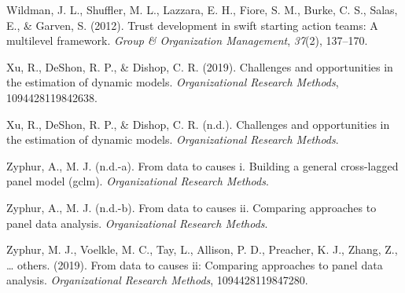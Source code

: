 \documentclass[english,,man]{apa6}
\begin{document}
\leavevmode\hypertarget{ref-wildman2012trust}{}%
Wildman, J. L., Shuffler, M. L., Lazzara, E. H., Fiore, S. M., Burke, C. S., Salas, E., \& Garven, S. (2012). Trust development in swift starting action teams: A multilevel framework. \emph{Group \& Organization Management}, \emph{37}(2), 137--170.

\leavevmode\hypertarget{ref-xu2019challenges}{}%
Xu, R., DeShon, R. P., \& Dishop, C. R. (2019). Challenges and opportunities in the estimation of dynamic models. \emph{Organizational Research Methods}, 1094428119842638.

\leavevmode\hypertarget{ref-xu_deshon_dishop}{}%
Xu, R., DeShon, R. P., \& Dishop, C. R. (n.d.). Challenges and opportunities in the estimation of dynamic models. \emph{Organizational Research Methods}.

\leavevmode\hypertarget{ref-zyphura}{}%
Zyphur, A., M. J. (n.d.-a). From data to causes i. Building a general cross-lagged panel model (gclm). \emph{Organizational Research Methods}.

\leavevmode\hypertarget{ref-zyphurb}{}%
Zyphur, A., M. J. (n.d.-b). From data to causes ii. Comparing approaches to panel data analysis. \emph{Organizational Research Methods}.

\leavevmode\hypertarget{ref-zyphur2019data}{}%
Zyphur, M. J., Voelkle, M. C., Tay, L., Allison, P. D., Preacher, K. J., Zhang, Z., \ldots{} others. (2019). From data to causes ii: Comparing approaches to panel data analysis. \emph{Organizational Research Methods}, 1094428119847280.
\end{document}
